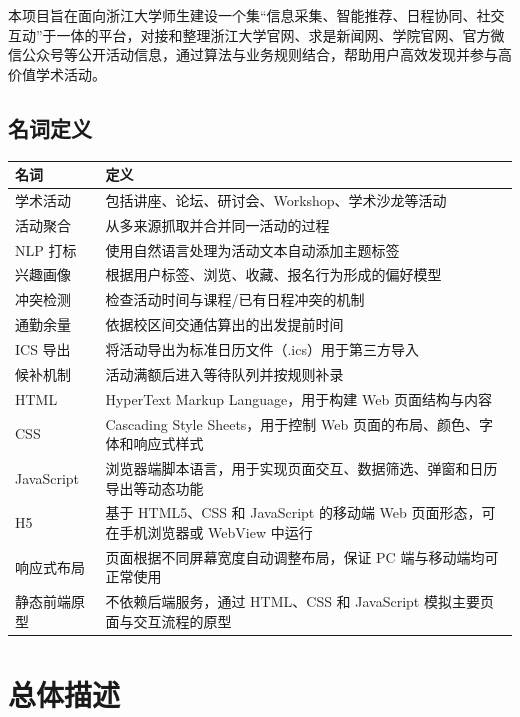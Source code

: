 \documentclass[UTF8,a4paper,12pt,fontset=none]{ctexrep}
\begin{document}
本项目旨在面向浙江大学师生建设一个集“信息采集、智能推荐、日程协同、社交互动”于一体的平台，对接和整理浙江大学官网、求是新闻网、学院官网、官方微信公众号等公开活动信息，通过算法与业务规则结合，帮助用户高效发现并参与高价值学术活动。

\section{名词定义}

\begingroup
\small
\begin{longtable}{|>{\raggedright\arraybackslash}p{}|>{\raggedright\arraybackslash}p{}|}
\hline
\textbf{名词} & \textbf{定义} \\
\hline
学术活动 & 包括讲座、论坛、研讨会、Workshop、学术沙龙等活动 \\
\hline
活动聚合 & 从多来源抓取并合并同一活动的过程 \\
\hline
NLP 打标 & 使用自然语言处理为活动文本自动添加主题标签 \\
\hline
兴趣画像 & 根据用户标签、浏览、收藏、报名行为形成的偏好模型 \\
\hline
冲突检测 & 检查活动时间与课程/已有日程冲突的机制 \\
\hline
通勤余量 & 依据校区间交通估算出的出发提前时间 \\
\hline
ICS 导出 & 将活动导出为标准日历文件（.ics）用于第三方导入 \\
\hline
候补机制 & 活动满额后进入等待队列并按规则补录 \\
\hline
HTML & HyperText Markup Language，用于构建 Web 页面结构与内容 \\
\hline
CSS & Cascading Style Sheets，用于控制 Web 页面的布局、颜色、字体和响应式样式 \\
\hline
JavaScript & 浏览器端脚本语言，用于实现页面交互、数据筛选、弹窗和日历导出等动态功能 \\
\hline
H5 & 基于 HTML5、CSS 和 JavaScript 的移动端 Web 页面形态，可在手机浏览器或 WebView 中运行 \\
\hline
响应式布局 & 页面根据不同屏幕宽度自动调整布局，保证 PC 端与移动端均可正常使用 \\
\hline
静态前端原型 & 不依赖后端服务，通过 HTML、CSS 和 JavaScript 模拟主要页面与交互流程的原型 \\
\hline
\end{longtable}
\endgroup

\chapter{总体描述}
\end{document}
